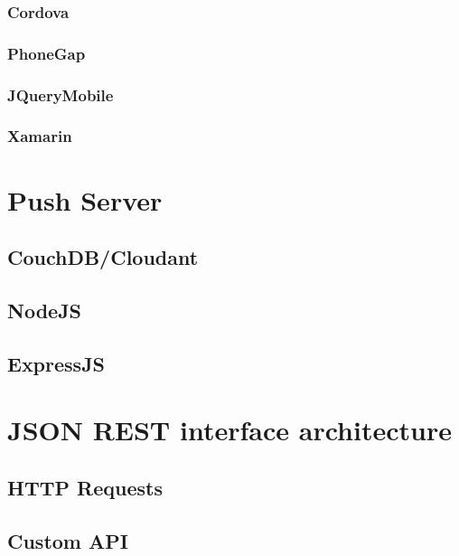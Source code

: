 \subsubsection{Cordova}

\subsubsection{PhoneGap}

\subsubsection{JQueryMobile}

\subsubsection{Xamarin}

  \section{Push Server}


\subsection{CouchDB/Cloudant}

\subsection{NodeJS}

\subsection{ExpressJS}





  \section{JSON REST interface architecture}	%
  \subsection{HTTP Requests}
  \subsection{Custom API}

